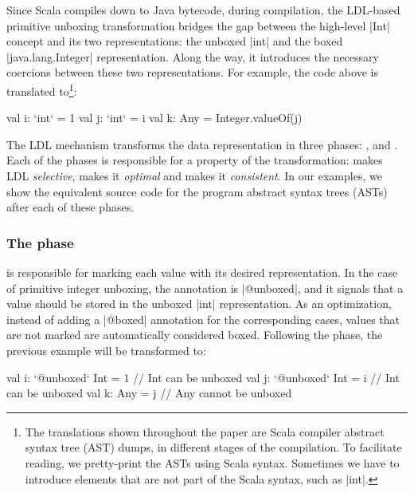 Since Scala compiles down to Java bytecode, during compilation, the LDL-based primitive unboxing transformation bridges the gap between the high-level |Int| concept and its two representations: the unboxed |int| and the boxed |java.lang.Integer| representation. Along the way, it introduces the necessary coercions between these two representations. For example, the code above is translated to\footnote{The translations shown throughout the paper are Scala compiler abstract syntax tree (AST) dumps, in different stages of the compilation. To facilitate reading, we pretty-print the ASTs using Scala syntax. Sometimes we have to introduce elements that are not part of the Scala syntax, such as |int|.}:

\begin{lstlisting-nobreak}
val i: `int` = 1
val j: `int` = i
val k: Any = Integer.valueOf(j)
\end{lstlisting-nobreak}

The LDL mechanism transforms the data representation in three phases:
\inject{}, \coerce{} and \commit{}. Each of the phases is responsible
for a property of the transformation: \inject{} makes LDL
\emph{selective}, \coerce{} makes it \emph{optimal} and \commit{}
makes it \emph{consistent}. In our examples, we show the equivalent
source code for the program abstract syntax trees (ASTs) after each of
these phases.

\vspace{-0.2em}
\subsubsection{The \inject{} phase} is responsible for marking each value with its desired representation. In the case of primitive integer unboxing, the annotation is |@unboxed|, and it signals that a value should be stored in the unboxed |int| representation. As an optimization, instead of adding a |@boxed| annotation for the corresponding cases, values that are not marked are automatically considered boxed. Following the \inject{} phase, the previous example will be transformed to:

\vspace{-0.1em}
\begin{lstlisting-nobreak}
val i: `@unboxed` Int = 1 // Int can be unboxed
val j: `@unboxed` Int = i // Int can be unboxed
val k: Any = j                  // Any cannot be unboxed
\end{lstlisting-nobreak}


